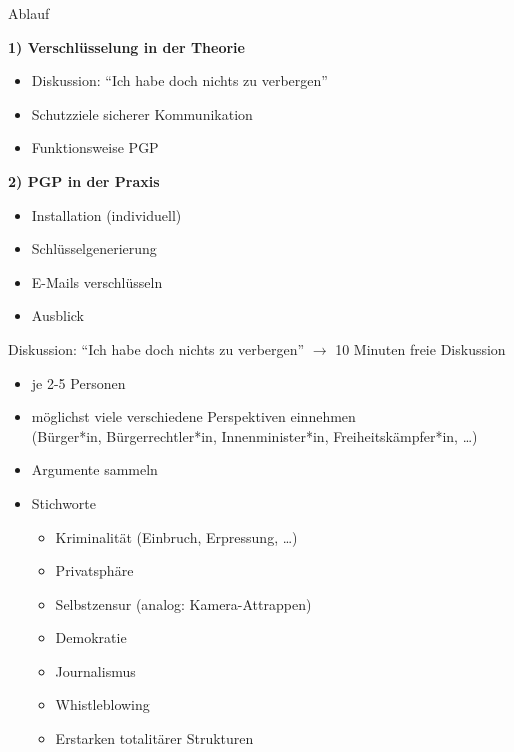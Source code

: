 \documentclass{beamer}
\begin{document}

\begin{frame}{Ablauf}

  \textbf{1) Verschlüsselung in der Theorie}
  \begin{itemize}
   \item Diskussion: "`Ich habe doch nichts zu verbergen"'
   \item Schutzziele sicherer Kommunikation
   \item Funktionsweise PGP
  \end{itemize}

  \pause

  \textbf{2) PGP in der Praxis}
  \begin{itemize}
   \item Installation (individuell)
   \item Schlüsselgenerierung
   \item E-Mails verschlüsseln
   \item Ausblick
  \end{itemize}

\end{frame}


\begin{frame}{Diskussion: "`Ich habe doch nichts zu verbergen"'}
  $\rightarrow$ 10 Minuten freie Diskussion

  \begin{itemize}
   \item  je 2-5 Personen
   \item möglichst viele verschiedene Perspektiven einnehmen\\
  (Bürger*in, Bürgerrechtler*in, Innenminister*in, Freiheitskämpfer*in, …)
   \item Argumente sammeln

   \pause

   \item Stichworte
    \begin{itemize}
     \item Kriminalität (Einbruch, Erpressung, …)
     \item Privatsphäre
     \item Selbstzensur (analog: Kamera-Attrappen)
     \item Demokratie
     \item Journalismus
     \item Whistleblowing
     \item Erstarken totalitärer Strukturen
    \end{itemize}
  \end{itemize}

\end{frame}
\end{document}
